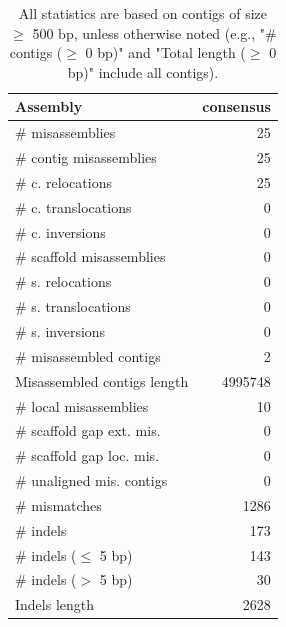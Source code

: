 \documentclass[12pt,a4paper]{article}
\begin{document}
\begin{table}[ht]
\begin{center}
\caption{All statistics are based on contigs of size $\geq$ 500 bp, unless otherwise noted (e.g., "\# contigs ($\geq$ 0 bp)" and "Total length ($\geq$ 0 bp)" include all contigs).}
\begin{tabular}{|l*{1}{|r}|}
\hline
Assembly & consensus \\ \hline
\# misassemblies & 25 \\ \hline
\hspace{2mm}\# contig misassemblies & 25 \\ \hline
\hspace{5mm}\# c. relocations & 25 \\ \hline
\hspace{5mm}\# c. translocations & 0 \\ \hline
\hspace{5mm}\# c. inversions & 0 \\ \hline
\hspace{2mm}\# scaffold misassemblies & 0 \\ \hline
\hspace{5mm}\# s. relocations & 0 \\ \hline
\hspace{5mm}\# s. translocations & 0 \\ \hline
\hspace{5mm}\# s. inversions & 0 \\ \hline
\# misassembled contigs & 2 \\ \hline
Misassembled contigs length & 4995748 \\ \hline
\# local misassemblies & 10 \\ \hline
\# scaffold gap ext. mis. & 0 \\ \hline
\# scaffold gap loc. mis. & 0 \\ \hline
\# unaligned mis. contigs & 0 \\ \hline
\# mismatches & 1286 \\ \hline
\# indels & 173 \\ \hline
\hspace{5mm}\# indels ($\leq$ 5 bp) & 143 \\ \hline
\hspace{5mm}\# indels ($>$ 5 bp) & 30 \\ \hline
Indels length & 2628 \\ \hline
\end{tabular}
\end{center}
\end{table}
\end{document}
